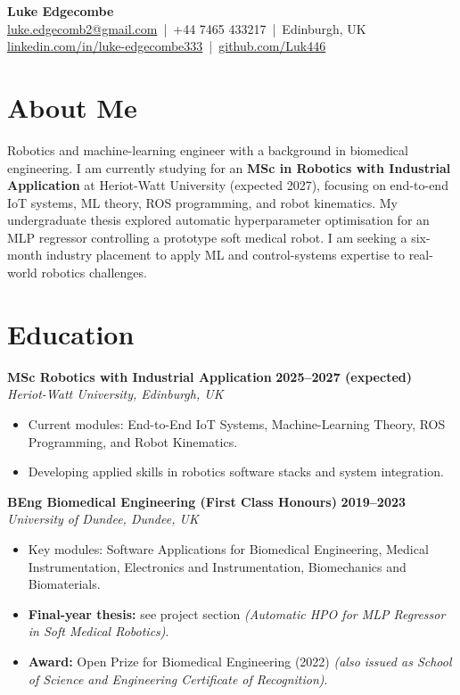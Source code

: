 \documentclass[a4paper,11pt]{article}
\begin{document}
\begin{center}
    {\LARGE \textbf{Luke Edgecombe}} \\[4pt]
    \href{mailto:luke.edgecomb2@gmail.com}{luke.edgecomb2@gmail.com} \,|\, +44 7465 433217 \,|\, Edinburgh, UK \\
    \href{https://linkedin.com/in/luke-edgecombe333}{linkedin.com/in/luke-edgecombe333} \,|\, 
    \href{https://github.com/Luk446}{github.com/Luk446}
\end{center}

\vspace{0.3cm}

\section*{About Me}
Robotics and machine-learning engineer with a background in biomedical engineering. I am currently studying for an \textbf{MSc in Robotics with Industrial Application} at Heriot-Watt University (expected 2027), focusing on end-to-end IoT systems, ML theory, ROS programming, and robot kinematics. My undergraduate thesis explored automatic hyperparameter optimisation for an MLP regressor controlling a prototype soft medical robot. I am seeking a six-month industry placement to apply ML and control-systems expertise to real-world robotics challenges.

\section*{Education}

\textbf{MSc Robotics with Industrial Application} \hfill \textbf{2025--2027 (expected)}\\
\textit{Heriot-Watt University, Edinburgh, UK}
\begin{itemize}
    \item Current modules: End-to-End IoT Systems, Machine-Learning Theory, ROS Programming, and Robot Kinematics.
    \item Developing applied skills in robotics software stacks and system integration.
\end{itemize}

\textbf{BEng Biomedical Engineering (First Class Honours)} \hfill \textbf{2019--2023}\\
\textit{University of Dundee, Dundee, UK}
\begin{itemize}
    \item Key modules: Software Applications for Biomedical Engineering, Medical Instrumentation, Electronics and Instrumentation, Biomechanics and Biomaterials.
    \item \textbf{Final-year thesis:} see project section \emph{(Automatic HPO for MLP Regressor in Soft Medical Robotics)}.
    \item \textbf{Award:} Open Prize for Biomedical Engineering (2022) \emph{(also issued as School of Science and Engineering Certificate of Recognition)}.
\end{itemize}
\end{document}
